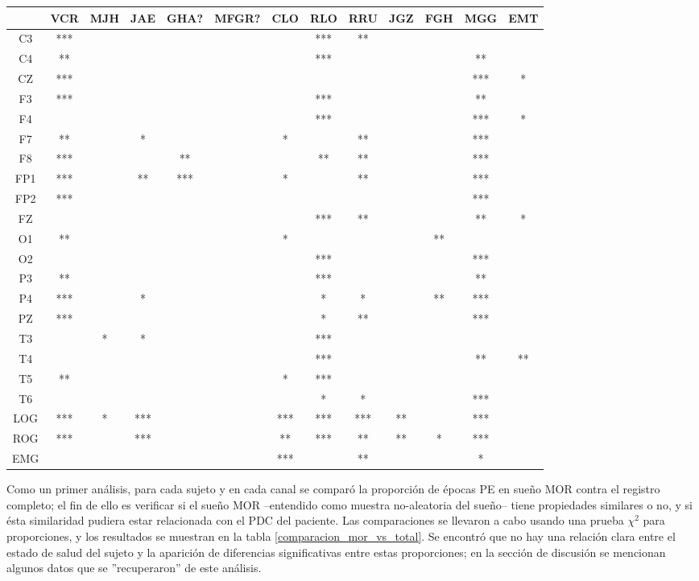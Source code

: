 \begin{SidewaysFigure}
\centering
\begin{tabular}{c||ccccc||cccc||ccc}
& VCR & MJH & JAE & GHA? & MFGR? & CLO & RLO & RRU & JGZ & FGH & MGG & EMT \\
\hline
 C3 & *** &&&&&& *** & ** &&&& \\
 C4 & ** &&&&&& *** &&&& ** & \\
 CZ & *** &&&&&&&&&& *** & *  \\
 F3 & *** &&&&&& *** &&&& ** & \\
 F4 &&&&&&& *** &&&& *** & *  \\
 F7 & ** && * &&& * && ** &&& *** & \\
 F8 & *** &&& ** &&& ** & ** &&& *** & \\
 FP1 & *** && ** & *** && * && ** &&& *** & \\
 FP2 & *** &&&&&&&&&& *** & \\
 FZ &&&&&&& *** & ** &&& ** & *  \\
 O1 & ** &&&&& * &&&& ** && \\
 O2 &&&&&&& *** &&&& *** & \\
 P3 & ** &&&&&& *** &&&& ** & \\
 P4 & *** && * &&&& * & * && ** & *** & \\
 PZ & *** &&&&&& * & ** &&& *** & \\
 T3 && * & * &&&& *** &&&&& \\
 T4 &&&&&&& *** &&&& ** & **  \\
 T5 & ** &&&&& * & *** &&&&& \\
 T6 &&&&&&& * & * &&& *** & \\
 LOG & *** & * & *** &&& *** & *** & *** & ** && *** & \\
 ROG & *** && *** &&& ** & *** & ** & ** & * & *** & \\
 EMG &&&&&& *** && ** &&& * &
\end{tabular}
\caption{Diferencias significativas en la comparaci\'on entre proporci\'on
de \'epocas PE en sue\~no MOR (fase R) y no-MOR (fases W y N)}
\label{comparacion_mor_vs_total}
\end{SidewaysFigure}

Como un primer an\'alisis, para cada sujeto y en cada canal 
se compar\'o la proporci\'on de \'epocas PE en sue\~no MOR contra el registro completo;
el fin de ello es verificar si el sue\~no MOR --entendido como muestra no-aleatoria
del sue\~no-- tiene propiedades similares o no, y si \'esta similaridad pudiera estar
relacionada con el PDC del paciente. 
Las comparaciones se llevaron a cabo usando una prueba $\chi^{2}$ para proporciones,
y los resultados se muestran en la tabla \ref{comparacion_mor_vs_total}.
Se encontr\'o que no hay una relaci\'on clara entre el estado de salud del sujeto y
la aparici\'on de diferencias significativas entre estas proporciones; en la secci\'on
de discusi\'on se mencionan algunos datos que se ''recuperaron'' de este an\'alisis.

